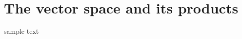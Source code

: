 \documentclass[book.tex]{subfiles}
\begin{document}
\chapter{The vector space and its products}

sample text
\end{document}
